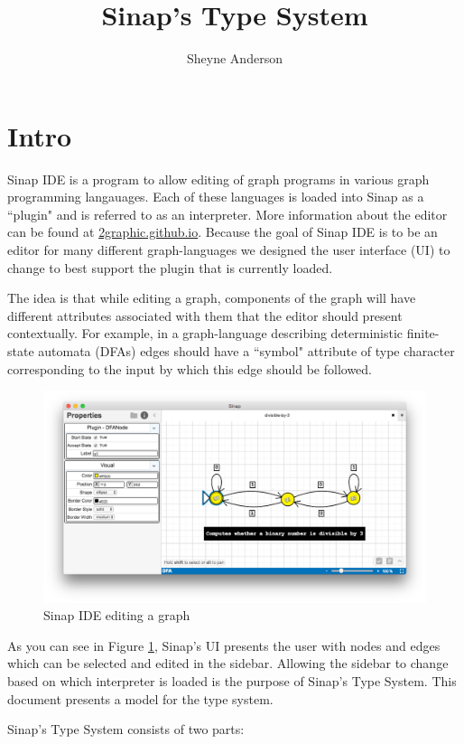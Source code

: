 \documentclass{article}
\begin{document}
\title{Sinap's Type System}
\author{Sheyne Anderson}
\maketitle
\section{Intro}
Sinap IDE is a program to allow editing of graph
programs in various graph programming langauages. Each of these 
languages is loaded into Sinap as a ``plugin" and is 
referred to as an interpreter. More information 
about the editor can be found at 
\href{https://2graphic.github.io}{2graphic.github.io}.
Because the goal of Sinap IDE is to be an editor for many 
different graph-languages we designed the user interface (UI)
to change to best support the plugin that is currently loaded. 

The idea is that while editing a graph, components of the
graph will have different attributes associated with them 
that the editor should present contextually. For example, in
a graph-language describing deterministic finite-state 
automata (DFAs) edges should have a ``symbol" attribute of 
type character corresponding to the input by which this 
edge should be followed. 

\begin{figure}
    \centering
    \includegraphics[width=.8\textwidth]{sinap-screenshot}
    \caption{Sinap IDE editing a graph}
    \label{sinap-screenshot}  
\end{figure}

As you can see in Figure \ref{sinap-screenshot}, Sinap's UI
presents the user with nodes and edges which can be selected 
and edited in the sidebar. Allowing the sidebar to change based
on which interpreter is loaded is the purpose of Sinap's Type System. 
This document presents a model for the type system. 
    
Sinap's Type System consists of two parts:
\end{document}

